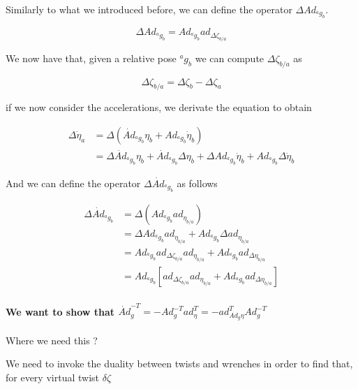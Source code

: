 \documentclass[12pt,a4paper]{book}
\newcommand{\agb}{\ensuremath{{^a g _b}}}
\newcommand{\etab}{\ensuremath{{\eta_{b}}}}
\newcommand{\etaba}{\ensuremath{{\eta_{b/a}}}}
\newcommand{\dotetaa}{\ensuremath{{\dot{\eta}_{a}}}}
\newcommand{\dotetab}{\ensuremath{{\dot{\eta}_{b}}}}
\newcommand{\Adagb}{\ensuremath{Ad_{\agb}}}
\newcommand{\dotAdagb}{\ensuremath{\dot{Ad}_{\agb}}}
\newcommand{\adetaba}{\ensuremath{ad_{\etaba}}}
\newcommand{\Dzetaba}{\ensuremath{{\Delta \zeta_{b/a}}}}
\newcommand{\adDzetaba}{\ensuremath{ad_{\Dzetaba}}}
\begin{document}
Similarly to what we introduced before, we can define the operator $\Delta \Adagb$.

\begin{equation}\label{eq: definition of Delta Ad g}
	\Delta \Adagb = \Adagb \adDzetaba
\end{equation}



We now have that, given a relative pose \agb{} we can compute \Dzetaba{} as 

\begin{equation}
	\Dzetaba = \Delta \zeta _b - \Delta \zeta _a 
\end{equation}


if we now consider the accelerations, we derivate the equation to obtain 

\begin{equation}
\begin{aligned}
	\Delta \dotetaa 	&= \Delta  \left( \dotAdagb \etab + \Adagb \dotetab \right) \\
					&= 
\Delta \dotAdagb \etab+
\dotAdagb \Delta \etab
+
\Delta \Adagb \dotetab+
\Adagb \Delta \dotetab							
\end{aligned}
\end{equation}

And we can define the operator $\Delta \dotAdagb$  as follows

\begin{equation}
\begin{aligned}
	\Delta \dotAdagb 	&= \Delta  \left( \Adagb \adetaba \right)  \\
		&=  \Delta \Adagb \adetaba +  \Adagb \Delta \adetaba \\
		&= \Adagb \adDzetaba \adetaba + \Adagb ad_{\Delta \etaba} \\
		&= \Adagb \left[ \adDzetaba \adetaba + \Adagb ad_{\Delta \etaba} \right]
\end{aligned}
\end{equation}



\paragraph{We want to show that $\dot{Ad}_g^{-T} = - Ad_g^{-T} ad_\eta ^T = - ad^T _{Ad_g \eta} Ad_g ^{-T}$}

\color{red} Where we need this ? \color{black}



We need to invoke the duality between twists and wrenches in order to find that, for every virtual twist $\delta \zeta$
\end{document}
